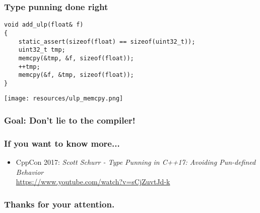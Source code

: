 \documentclass[aspectratio=169]{beamer}
\newif\iftransitions
\begin{document}
\begin{frame}[fragile]
  \frametitle{Type punning done right}

  \iftransitions
  \setbeamercolor{alerted text}{fg=red}
  \setbeamerfont{alerted text}{series=\bfseries,family=\ttfamily}
  \begin{semiverbatim}
\uncover<1->{\alert<0>{{\color{blue}void} add_ulp({\color{blue}float}& f)}}
\uncover<1->{\alert<0>{\{}}
\uncover<3->{\alert<0>{    {\color{blue}static_assert}({\color{blue}sizeof}({\color{blue}float}) == {\color{blue}sizeof}(uint32_t));}}
\uncover<2->{\alert<0>{    uint32_t tmp;}}
\uncover<4->{\alert<0>{    memcpy(&tmp, &f, {\color{blue}sizeof}({\color{blue}float}));}}
\uncover<2->{\alert<0>{    ++tmp;}}
\uncover<4->{\alert<0>{    memcpy(&f, &tmp, {\color{blue}sizeof}({\color{blue}float}));}}
\uncover<1->{\alert<0>{\}}}
  \end{semiverbatim}
  \else
  
  \begin{lstlisting}
void add_ulp(float& f)
{
    static_assert(sizeof(float) == sizeof(uint32_t));
    uint32_t tmp;
    memcpy(&tmp, &f, sizeof(float));
    ++tmp;
    memcpy(&f, &tmp, sizeof(float));
}
  \end{lstlisting}
  \fi
  
  \iftransitions \uncover<5->{\texttt{[image: resources/ulp\_memcpy.png]}} \else \texttt{[image: resources/ulp\_memcpy.png]} \fi

\end{frame}


\begin{frame}[fragile]
  \frametitle{Goal: Don't lie to the compiler!}
\end{frame}

\begin{frame}
  \frametitle{If you want to know more...}

  \begin{itemize}
  \item CppCon 2017: \emph{Scott Schurr - Type Punning in C++17: Avoiding Pun-defined Behavior} \\ \href{https://www.youtube.com/watch?v=sCjZuvtJd-k}{https://www.youtube.com/watch?v=sCjZuvtJd-k}
  \end{itemize}
    
\end{frame}

\begin{frame}
  \frametitle{Thanks for your attention.}
\end{frame}
\end{document}
